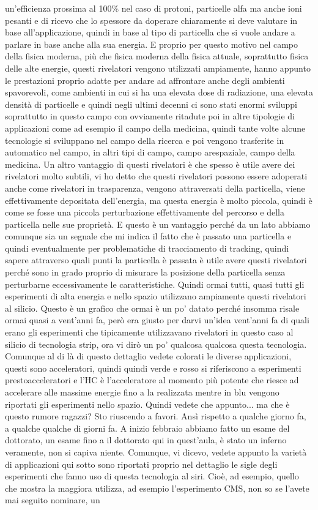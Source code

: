 un'efficienza prossima al 100\% nel caso di protoni, particelle alfa ma anche ioni pesanti e di ricevo che lo spessore da doperare chiaramente si deve valutare in base all'applicazione, quindi in base al tipo di particella che si vuole andare a parlare in base anche alla sua energia. E proprio per questo motivo nel campo della fisica moderna, più che fisica moderna della fisica attuale, soprattutto fisica delle alte energie, questi rivelatori vengono utilizzati ampiamente, hanno appunto le prestazioni proprio adatte per andare ad affrontare anche degli ambienti spavorevoli, come ambienti in cui si ha una elevata dose di radiazione, una elevata densità di particelle e quindi negli ultimi decenni ci sono stati enormi sviluppi soprattutto in questo campo con ovviamente ritadute poi in altre tipologie di applicazioni come ad esempio il campo della medicina, quindi tante volte alcune tecnologie si sviluppano nel campo della ricerca e poi vengono trasferite in automatico nel campo, in altri tipi di campo, campo arespaziale, campo della medicina. Un altro vantaggio di questi rivelatori è che spesso è utile avere dei rivelatori molto subtili, vi ho detto che questi rivelatori possono essere adoperati anche come rivelatori in trasparenza, vengono attraversati della particella, viene effettivamente depositata dell'energia, ma questa energia è molto piccola, quindi è come se fosse una piccola perturbazione effettivamente del percorso e della particella nelle sue proprietà. E questo è un vantaggio perché da un lato abbiamo comunque sia un segnale che mi indica il fatto che è passato una particella e quindi eventualmente per problematiche di tracciamento di tracking, quindi sapere attraverso quali punti la particella è passata è utile avere questi rivelatori perché sono in grado proprio di misurare la posizione della particella senza perturbarne eccessivamente le caratteristiche. Quindi ormai tutti, quasi tutti gli esperimenti di alta energia e nello spazio utilizzano ampiamente questi rivelatori al silicio. Questo è un grafico che ormai è un po' datato perché insomma risale ormai quasi a vent'anni fa, però era giusto per darvi un'idea vent'anni fa di quali erano gli esperimenti che tipicamente utilizzavano rivelatori in questo caso al silicio di tecnologia strip, ora vi dirò un po' qualcosa qualcosa questa tecnologia. Comunque al di là di questo dettaglio vedete colorati le diverse applicazioni, questi sono acceleratori, quindi quindi verde e rosso si riferiscono a esperimenti prestoacceleratori e l'HC è l'acceleratore al momento più potente che riesce ad accelerare alle massime energie fino a la realizzata mentre in blu vengono riportati gli esperimenti nello spazio. Quindi vedete che appunto... ma che è questo rumore ragazzi? Sto riuscendo a favori. Ansì rispetto a qualche giorno fa, a qualche qualche di giorni fa. A inizio febbraio abbiamo fatto un esame del dottorato, un esame fino a il dottorato qui in quest'aula, è stato un inferno veramente, non si capiva niente. Comunque, vi dicevo, vedete appunto la varietà di applicazioni qui sotto sono riportati proprio nel dettaglio le sigle degli esperimenti che fanno uso di questa tecnologia al siri. Cioè, ad esempio, quello che mostra la maggiora utilizza, ad esempio l'esperimento CMS, non so se l'avete mai seguito nominare, un 